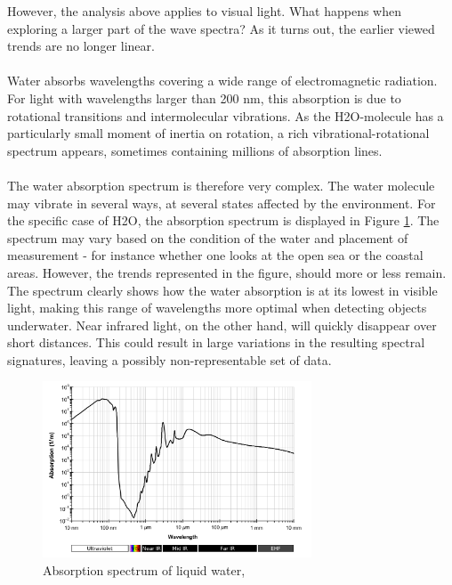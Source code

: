 
\noindent
However, the analysis above applies to visual light. What happens when exploring a larger part of the wave spectra? As it turns out, the earlier viewed trends are no longer linear.
\\\\
Water absorbs wavelengths covering a wide range of electromagnetic radiation. For light with wavelengths larger than 200 nm, this absorption is due to rotational transitions and intermolecular vibrations. As the H2O-molecule has a particularly small moment of inertia on rotation, a rich vibrational-rotational spectrum appears, sometimes containing millions of absorption lines.
\\\\
The water absorption spectrum is therefore very complex. The water molecule may vibrate in several ways, at several states affected by the environment. For the specific case of H2O, the absorption spectrum is displayed in Figure \ref{fig:absspec}. The spectrum may vary based on the condition of the water and placement of measurement - for instance whether one looks at the open sea or the coastal areas. However, the trends represented in the figure, should more or less remain. The spectrum clearly shows how the water absorption is at its lowest in visible light, making this range of wavelengths more optimal when detecting objects underwater. Near infrared light, on the other hand, will quickly disappear over short distances. This could result in large variations in the resulting spectral signatures, leaving a possibly non-representable set of data.  \cite{chaplin_2018}

\begin{figure}[H]
    \centering
    \includegraphics[width=8cm]{Images/theory/Absorption_spectrum_of_liquid_water.png}
    \caption[Water Absorption Spectrum]{Absorption spectrum of liquid water, \cite{kebes_2016}}
    \label{fig:absspec}
\end{figure}




